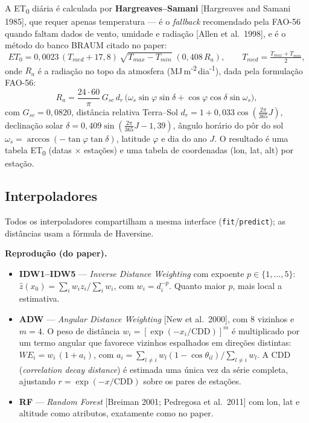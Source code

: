 A ET\textsubscript{0} diária é calculada por \textbf{Hargreaves--Samani}
[Hargreaves and Samani 1985], que requer apenas temperatura --- é o \emph{fallback}
recomendado pela FAO-56 quando faltam dados de vento, umidade e radiação
[Allen et al.\ 1998], e é o método do banco BRAUM citado no paper:
%
\begin{equation}
  ET_0 = 0{,}0023\,(T_{med} + 17{,}8)\,\sqrt{T_{max} - T_{min}}\;(0{,}408\,R_a),
  \qquad T_{med} = \tfrac{T_{max}+T_{min}}{2},
\end{equation}
%
onde $R_a$ é a radiação no topo da atmosfera (MJ\,m\textsuperscript{-2}\,dia\textsuperscript{-1}),
dada pela formulação FAO-56:
%
\begin{equation}
  R_a = \frac{24\cdot 60}{\pi}\,G_{sc}\,d_r\,
        \bigl(\omega_s \sin\varphi \sin\delta + \cos\varphi \cos\delta \sin\omega_s\bigr),
\end{equation}
%
com $G_{sc}=0{,}0820$, distância relativa Terra--Sol $d_r = 1 + 0{,}033\cos(\frac{2\pi}{365}J)$,
declinação solar $\delta = 0{,}409\sin(\frac{2\pi}{365}J - 1{,}39)$, ângulo horário
do pôr do sol $\omega_s = \arccos(-\tan\varphi \tan\delta)$, latitude $\varphi$ e
dia do ano $J$. O resultado é uma tabela ET\textsubscript{0} (datas $\times$
estações) e uma tabela de coordenadas (lon, lat, alt) por estação.

\subsection{Interpoladores}

Todos os interpoladores compartilham a mesma interface
(\texttt{fit}/\texttt{predict}); as distâncias usam a fórmula de Haversine.

\textbf{Reprodução (do paper).}
\begin{itemize}
  \item \textbf{IDW1--IDW5} --- \emph{Inverse Distance Weighting} com expoente
        $p \in \{1,\dots,5\}$:
        $\hat z(x_0) = \sum_i w_i z_i / \sum_i w_i$, com $w_i = d_i^{-p}$. Quanto
        maior $p$, mais local a estimativa.
  \item \textbf{ADW} --- \emph{Angular Distance Weighting} [New et al.\ 2000], com
        8 vizinhos e $m=4$. O peso de distância $w_i = [\exp(-x_i/\mathrm{CDD})]^{m}$
        é multiplicado por um termo angular que favorece vizinhos espalhados em
        direções distintas:
        $WE_i = w_i\,(1 + a_i)$, com
        $a_i = \sum_{l\neq i} w_l (1 - \cos\theta_{il}) / \sum_{l\neq i} w_l$.
        A CDD (\emph{correlation decay distance}) é estimada uma única vez da série
        completa, ajustando $r = \exp(-x/\mathrm{CDD})$ sobre os pares de estações.
  \item \textbf{RF} --- \emph{Random Forest} [Breiman 2001; Pedregosa et al.\ 2011]
        com lon, lat e altitude como atributos, exatamente como no paper.
\end{itemize}

